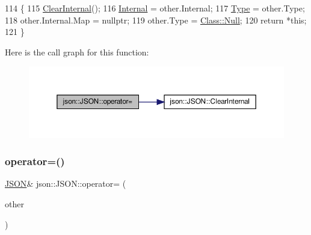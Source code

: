 \begin{DoxyCode}
114                                         \{
115             \mbox{\hyperlink{classjson_1_1_j_s_o_n_afefdc8c18c2c40575c2c8463fbd78c67}{ClearInternal}}();
116             \mbox{\hyperlink{classjson_1_1_j_s_o_n_a1e2a064794c3d55c8bb8887fc5734947}{Internal}} = other.Internal;
117             \mbox{\hyperlink{classjson_1_1_j_s_o_n_a3fa6923afa41bdfe38077fbc0079aaf5}{Type}} = other.Type;
118             other.Internal.Map = \textcolor{keyword}{nullptr};
119             other.Type = \mbox{\hyperlink{classjson_1_1_j_s_o_n_a762f55df6d407c1af61607ed516ffe07abbb93ef26e3c101ff11cdd21cab08a94}{Class::Null}};
120             \textcolor{keywordflow}{return} *\textcolor{keyword}{this};
121         \}
\end{DoxyCode}
Here is the call graph for this function\+:
\nopagebreak
\begin{figure}[H]
\begin{center}
\leavevmode
\includegraphics[width=350pt]{classjson_1_1_j_s_o_n_ab22885428262d4ed0a95c50d5537b13e_cgraph}
\end{center}
\end{figure}
\mbox{\label{classjson_1_1_j_s_o_n_ac60d87eca03625eb071fb0c98febbb97}} 
\subsubsection{\texorpdfstring{operator=()}{operator=()}\hspace{0.1cm}{\footnotesize\ttfamily [2/6]}}
{\footnotesize\ttfamily \mbox{\hyperlink{classjson_1_1_j_s_o_n}{J\+S\+ON}}\& json\+::\+J\+S\+O\+N\+::operator= (\begin{DoxyParamCaption}\item[{const \mbox{\hyperlink{classjson_1_1_j_s_o_n}{J\+S\+ON}} \&}]{other }\end{DoxyParamCaption})\hspace{0.3cm}{\ttfamily [inline]}}



